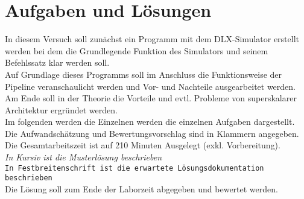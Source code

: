 \documentclass[a4paper,ngerman]{scrartcl}
\begin{document}
\section{Aufgaben und Lösungen}
In diesem Versuch soll zunächst ein Programm mit dem DLX-Simulator erstellt werden bei dem die Grundlegende Funktion des Simulators und seinem Befehlssatz klar werden soll. \\
Auf Grundlage dieses Programms soll im Anschluss die Funktionsweise der Pipeline veranschaulicht werden und Vor- und Nachteile ausgearbeitet werden. 
Am Ende soll in der Theorie die Vorteile und evtl. Probleme von superskalarer Architektur ergründet werden.  \\
Im folgenden werden die Einzelnen werden die einzelnen Aufgaben dargestellt. \\
Die Aufwandschätzung und Bewertungsvorschlag sind in Klammern angegeben.  \\
Die Gesamtarbeitszeit ist auf 210 Minuten Ausgelegt (exkl. Vorbereitung). \\
\textit{In Kursiv ist die Musterlösung beschrieben}\\
\texttt{In Festbreitenschrift ist die erwartete Lösungsdokumentation beschrieben}\\
Die Lösung soll zum Ende der Laborzeit abgegeben und bewertet werden. 
%
\end{document}
